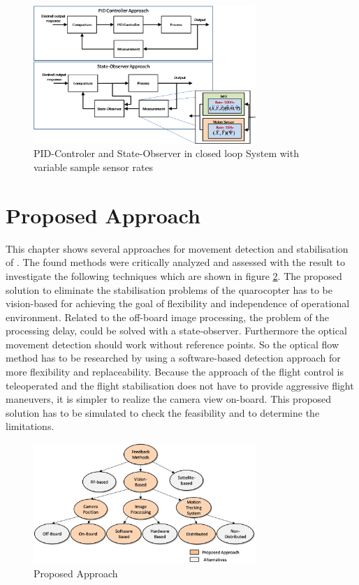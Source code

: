 \begin{figure}[!htbp]
	\centering
		\includegraphics[width=0.75\textwidth]{graphic/ClosedLoopControlSyst.png}
\caption
{PID-Controler and State-Observer in closed loop System with variable sample sensor rates}
	\label{fig:ClosedLoopControlSyst.png}
\end{figure}

\newpage
\section{Proposed Approach}

This chapter shows several approaches for movement detection and stabilisation of
\UAV. The found methods were critically analyzed and assessed with the result
to investigate the following techniques which are shown in figure \ref{fig:ProposedApproach.png}.
 The proposed solution to eliminate the stabilisation problems of the
 quarocopter has to be vision-based for achieving the goal of flexibility and independence of
operational environment. Related to the off-board image processing, the problem
of the processing delay, could be solved with a state-observer. Furthermore the
optical movement detection should work without reference points.
 So the optical flow method has to be researched by using a
software-based detection approach for more flexibility and replaceability.
Because the approach of the flight control is teleoperated and the flight
stabilisation does not have to provide aggressive flight maneuvers, it is simpler
to realize the camera view on-board. This proposed solution has to be simulated
 to check the feasibility and to determine the limitations.


\begin{figure}[!htbp]
	\centering
		\includegraphics[width=0.75\textwidth]{graphic/ProposedApproach.png}
\caption
{Proposed Approach}
	\label{fig:ProposedApproach.png}
\end{figure}
